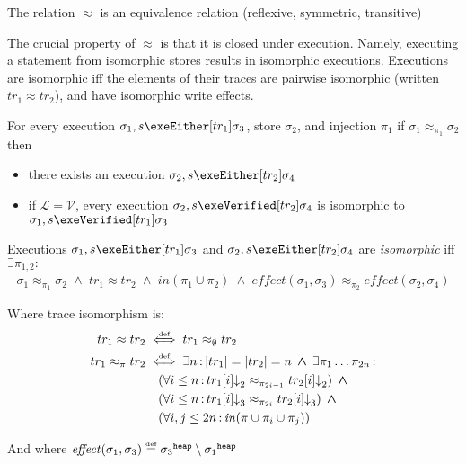 \documentclass[runningheads,a4paper]{llncs}
\DeclareMathOperator{\band}{\bm{\;\land\;}}
\DeclareMathOperator{\suchthat}{:}
\newcommand*{\qvars}[2]{#1_{#2}}
\newcommand*{\cardinality}[1]{\left|{#1}\right|}
\newcommand*{\defeq}{\stackrel{\text{\tiny def}}{=}}
\newcommand*{\defiff}{\stackrel{\text{\tiny def}}{\iff}}
\newcommand*{\evalat}{{\downarrow}}
\newcommand{\tr}{tr}
\newcommand*\iso{\approx}
\newcommand*\Lsemantics{\mathcal{L}}
\newcommand*\Vsemantics{\mathcal{V}}
\newcommand{\diff}{\mathit{effect}}
\newcommand*{\bijection}[1]{\mathit{in}{\left(#1\right)}}
\newcommand*{\store}{\sigma}
\newcommand*{\heapof}[1]{{#1}^{\mathtt{heap}}}
\newcommand*{\isoref}{\hyperref[def:global isomorphism]{\ensuremath{\iso}}}
\begin{document}
\begin{lemma}\label{lem:isomorphism is equivalence}
The relation $\iso$ is an equivalence relation (reflexive, symmetric, transitive)
\end{lemma}

The crucial property of \isoref{} is that it is closed under execution. Namely, executing a statement from isomorphic stores results in isomorphic executions. Executions are isomorphic iff the elements of their traces are pairwise isomorphic (written $\tr_1 \iso \tr_2$), and have isomorphic write effects.

\begin{lemma}\label{lem:closed under isomorphism}\setlength{\parindent}{0cm}

For every execution $\store_1,s\exeEither[\tr_1]\store_3$, store $\store_2$, and injection $\pi_1$ if $\store_1 \iso_{\pi_1} \store_2$ then
\begin{itemize}
	\item there exists an execution $\store_2,s\exeEither[\tr_2]\store_4$
	\item if $\Lsemantics{}=\Vsemantics{}$, every execution $\store_2,s\exeVerified[\tr_2]\store_4$ is isomorphic to $\store_1,s\exeVerified[\tr_1]\store_3$
\end{itemize}

Executions $\store_1,s\exeEither[\tr_1]\store_3$ and $\store_2,s\exeEither[\tr_2]\store_4$ are \emph{isomorphic} iff $\exists \qvars{\pi}{1,2} \suchthat$
\[\begin{aligned}
\store_1 \iso_{\pi_1} \store_2 \band
  	\tr_1 \iso \tr_2 \band
	\bijection{\pi_1\cup\pi_2} \band
	\diff(\store_1,\store_3) \iso_{\pi_2} \diff(\store_2,\store_4)
\end{aligned}\]

Where trace isomorphism is:
\[\begin{aligned}
\tr_1 \iso \tr_2 &\defiff \tr_1 \iso_\emptyset \tr_2 \\
\tr_1 \iso_\pi \tr_2 &\defiff \exists n \suchthat
	\cardinality{\tr_1}=\cardinality{\tr_2}=n \band \exists \pi_1\ldots\pi_{2n}\suchthat \\
&\quad	(\forall i \le n \suchthat \tr_1[i]\evalat_{2}\iso_{\pi_{2i-1}}\tr_2[i]\evalat_{2}) \band \\
&\quad	(\forall i \le n \suchthat \tr_1[i]\evalat_{3}\iso_{\pi_{2i}}\tr_2[i]\evalat_{3}) \band \\
&\quad	(\forall i,j \le 2n \suchthat \bijection{\pi \cup \pi_i \cup \pi_j})
\end{aligned}\]

And where $\diff(\store_1,\store_3) \defeq \heapof{\store_3} \setminus \heapof{\store_1}$
\end{lemma}
\end{document}
